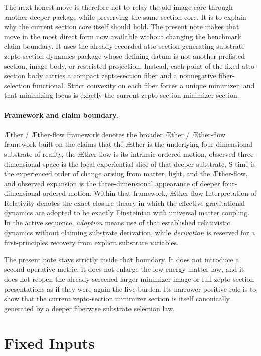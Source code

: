 \documentclass[11pt]{article}
\newcommand{\Aether}{\AE{}ther}
\newcommand{\Aflow}{\AE{}ther-flow}
\newcommand{\TheoryName}{\Aflow{} Interpretation of Relativity}
\newcommand{\TheoryProgram}{\Aether{} / \Aflow{} framework}
\begin{document}
The next honest move is therefore not to relay the old image core through another deeper package while preserving the same section core. It is to explain why the current section core itself should hold. The present note makes that move in the most direct form now available without changing the benchmark claim boundary. It uses the already recorded atto-section-generating substrate zepto-section dynamics package whose defining datum is not another prelisted section, image body, or restricted projection. Instead, each point of the fixed atto-section body carries a compact zepto-section fiber and a nonnegative fiber-selection functional. Strict convexity on each fiber forces a unique minimizer, and that minimizing locus is exactly the current zepto-section minimizer section.

\paragraph{Framework and claim boundary.}
\TheoryProgram{} denotes the broader \Aether{} / \Aflow{} framework built on the claims that the \Aether{} is the underlying four-dimensional substrate of reality, the \Aflow{} is its intrinsic ordered motion, observed three-dimensional space is the local experiential slice of that deeper substrate, S-time is the experienced order of change arising from matter, light, and the \Aflow{}, and observed expansion is the three-dimensional appearance of deeper four-dimensional ordered motion. Within that framework, \TheoryName{} denotes the exact-closure theory in which the effective gravitational dynamics are adopted to be exactly Einsteinian with universal matter coupling. In the active sequence, \emph{adoption} means use of that established relativistic dynamics without claiming substrate derivation, while \emph{derivation} is reserved for a first-principles recovery from explicit substrate variables.

The present note stays strictly inside that boundary. It does not introduce a second operative metric, it does not enlarge the low-energy matter law, and it does not reopen the already-screened larger minimizer-image or full zepto-section presentations as if they were again the live burden. Its narrower positive role is to show that the current zepto-section minimizer section is itself canonically generated by a deeper fiberwise substrate selection law.

\section{Fixed Inputs}
\end{document}
